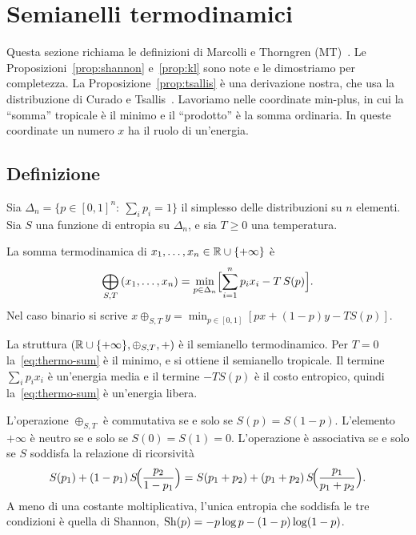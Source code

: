 \section{Semianelli termodinamici}
\label{sec:semirings}

Questa sezione richiama le definizioni di Marcolli e Thorngren (MT)~\citep{marcolli2014thermodynamic}.
Le Proposizioni~\ref{prop:shannon} e~\ref{prop:kl} sono note e le dimostriamo per completezza.
La Proposizione~\ref{prop:tsallis} è una derivazione nostra, che usa la distribuzione di Curado e Tsallis~\citep{curado1991generalized}.
Lavoriamo nelle coordinate min-plus, in cui la ``somma'' tropicale è il minimo e il ``prodotto'' è la somma ordinaria.
In queste coordinate un numero $x$ ha il ruolo di un'energia.

\subsection{Definizione}

Sia $\Delta_n=\{p\in[0,1]^n:\ \sum_ip_i=1\}$ il simplesso delle distribuzioni su $n$ elementi.
Sia $S$ una funzione di entropia su $\Delta_n$, e sia $T\ge0$ una temperatura.

\begin{definizione}[MT, Def.~4.1]
\label{def:thermo}
La somma termodinamica di $x_1,\dots,x_n\in\mathbb{R}\cup\{+\infty\}$ è
\begin{equation}
\bigoplus_{S,T}\,(x_1,\dots,x_n)=\min_{p\in\Delta_n}\Bigl[\sum_{i=1}^n p_ix_i-T\,S(p)\Bigr].
\label{eq:thermo-sum}
\end{equation}
Nel caso binario si scrive $x\oplus_{S,T}y=\min_{p\in[0,1]}[px+(1-p)y-TS(p)]$.
\end{definizione}

La struttura $(\mathbb{R}\cup\{+\infty\},\oplus_{S,T},+)$ è il semianello termodinamico.
Per $T=0$ la~\eqref{eq:thermo-sum} è il minimo, e si ottiene il semianello tropicale.
Il termine $\sum_ip_ix_i$ è un'energia media e il termine $-TS(p)$ è il costo entropico, quindi la~\eqref{eq:thermo-sum} è un'energia libera.

\begin{osservazione}
L'operazione $\oplus_{S,T}$ è commutativa se e solo se $S(p)=S(1-p)$.
L'elemento $+\infty$ è neutro se e solo se $S(0)=S(1)=0$.
L'operazione è associativa se e solo se $S$ soddisfa la relazione di ricorsività
\begin{equation}
S(p_1)+(1-p_1)\,S\!\Bigl(\frac{p_2}{1-p_1}\Bigr)=S(p_1+p_2)+(p_1+p_2)\,S\!\Bigl(\frac{p_1}{p_1+p_2}\Bigr).
\label{eq:assoc}
\end{equation}
A meno di una costante moltiplicativa, l'unica entropia che soddisfa le tre condizioni è quella di Shannon, $\mathrm{Sh}(p)=-p\log p-(1-p)\log(1-p)$.
\end{osservazione}

